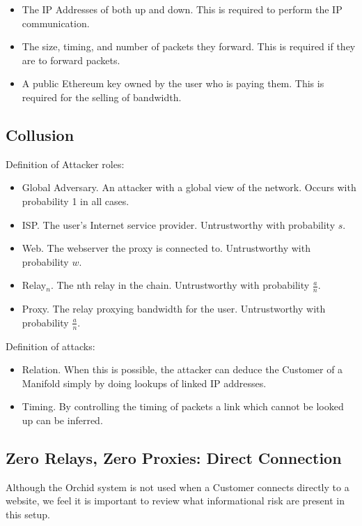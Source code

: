 \documentclass{article}
\newcommand{\mesh}{Orchid}
\newcommand{\Mesh}{\mesh}
\begin{document}
\begin{itemize}
    \item The IP Addresses of both up and down. This is required to perform the IP communication.
    \item The size, timing, and number of packets they forward. This is required if they are to forward packets.
    \item A public Ethereum key owned by the user who is paying them. This is required for the selling of bandwidth.
\end{itemize}

\subsection{Collusion}
\label{sec:collusion}

Definition of Attacker roles:

\begin{itemize}
\item Global Adversary. An attacker with a global view of the network. Occurs with probability 1 in all cases.
\item ISP. The user's Internet service provider. Untrustworthy with probability $s$.
\item Web. The webserver the proxy is connected to. Untrustworthy with probability $w$.
\item Relay$_n$. The nth relay in the chain. Untrustworthy with probability $\frac{a}{n}$.
\item Proxy. The relay proxying bandwidth for the user. Untrustworthy with probability $\frac{a}{n}$.
\end{itemize}

Definition of attacks:

\begin{itemize}
\item Relation. When this is possible, the attacker can deduce the Customer of a Manifold simply by doing lookups of linked IP addresses.
\item Timing. By controlling the timing of packets a link which cannot be looked up can be inferred.
\end{itemize}

\subsection{Zero Relays, Zero Proxies: Direct Connection}

Although the \Mesh{} system is not used when a Customer connects directly to a website, we feel it is important to review what informational risk are present in this setup.
\end{document}
